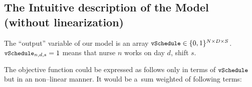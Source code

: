 \subsection{The Intuitive description of the Model (without linearization)}
\newcommand{\vSchedule}{\texttt{\small vSchedule}}
\newcommand{\vInteraction}{\texttt{\small vInteraction}}
\newcommand{\vWeekend}{\texttt{\small vWeekend}}
\newcommand{\vMinWeekendsWorked}{\texttt{\small vMinWeekendsWorked}}
\newcommand{\vMaxWeekendsWorked}{\texttt{\small vMaxWeekendsWorked}}
\newcommand{\pShiftLength}{\texttt{\small pShiftLength}}
\newcommand{\pWorkhoursLimit}{\texttt{\small pWorkhoursLimit}}
\newcommand{\vDayLengthBreakIndicator}{\texttt{\small vDayLengthBreakIndicator}}
\newcommand{\pNumerOfNurses}{\texttt{\small pNumerOfNurses}}
\newcommand{\pNumberOfDays}{\texttt{\small pNumberOfDays}}
\newcommand{\pNumberOfShifts}{\texttt{\small pNumberOfShifts}}
\newcommand{\pNumberOfWeeks}{\texttt{\small pNumberOfWeeks}}
\newcommand{\pMaxNightShifts}{\texttt{\small pMaxNightShifts}}
\newcommand{\pDemand}{\texttt{\small pDemand}}
\newcommand{\sNurses}{\texttt{\small sNurses}}
\newcommand{\sShifts}{\texttt{\small sShifts}}
\newcommand{\sDays}{\texttt{\small sDays}}
\newcommand{\sWeeks}{\texttt{\small sWeeks}}
\newcommand{\sVacations}{\texttt{\small sVacations}}
\newcommand{\sPreferredCompanions}{\texttt{\small sPreferredCompanions}}
\newcommand{\sUnpreferredCompanions}{\texttt{\small sUnpreferredCompanions}}
\newcommand{\sPreferredSlots}{\texttt{\small sPreferredSlots}}
\newcommand{\sUnpreferredSlots}{\texttt{\small sUnpreferredSlots}}
\newcommand{\vAlphaMin}{\texttt{\small vAlphaMin}}
\newcommand{\vAlphaMax}{\texttt{\small vAlphaMax}}
\newcommand{\pLambdaPC}{\texttt{\small pLambdaPS}}
\newcommand{\pLambdaUC}{\texttt{\small pLambdaUS}}
\newcommand{\pLambdaPS}{\texttt{\small pLambdaPC}}
\newcommand{\pLambdaUS}{\texttt{\small pLambdaUS}}
\newcommand{\pLambdaWHS}{\texttt{\small pLambdaWHS}}
\newcommand{\pLambdaW}{\texttt{\small pLambdaW}}
\newcommand{\vDemand}{\texttt{\small vDemand}}

The ``output'' variable of our model is an array $\vSchedule \in \{0, 1\}^{N \times D \times S}$. $\vSchedule_{n, d, s} = 1$ means that nurse $n$ works on day $d$, shift $s$.

The objective function could be expressed as follows only in terms of $\vSchedule$ but in an non--linear manner. It would be a~sum weighted of following terms:

